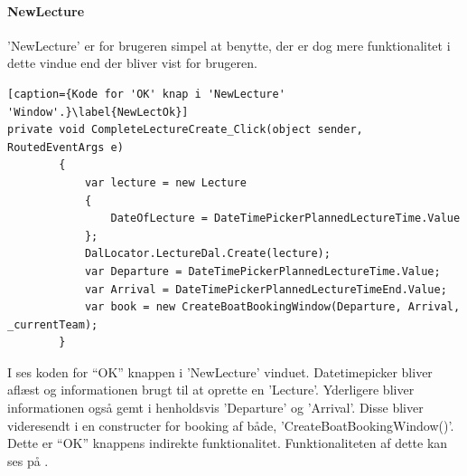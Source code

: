 \paragraph{NewLecture}
'NewLecture' er for brugeren simpel at benytte, der er dog mere funktionalitet i dette vindue end der bliver vist for brugeren.

\begin{lstlisting}[caption={Kode for 'OK' knap i 'NewLecture' 'Window'.}\label{NewLectOk}]
private void CompleteLectureCreate_Click(object sender, RoutedEventArgs e)
        {
            var lecture = new Lecture
            {
                DateOfLecture = DateTimePickerPlannedLectureTime.Value
            };
            DalLocator.LectureDal.Create(lecture);
            var Departure = DateTimePickerPlannedLectureTime.Value;
            var Arrival = DateTimePickerPlannedLectureTimeEnd.Value;
            var book = new CreateBoatBookingWindow(Departure, Arrival, _currentTeam);
        }
\end{lstlisting}
I  ses koden for ``OK'' knappen i 'NewLecture' vinduet. Datetimepicker bliver aflæst og informationen brugt til at oprette en 'Lecture'. Yderligere bliver informationen også gemt i henholdsvis 'Departure' og 'Arrival'. Disse bliver videresendt i en constructer for booking af både, 'CreateBoatBookingWindow()'. Dette er ``OK'' knappens indirekte funktionalitet. Funktionaliteten af dette kan ses på .

